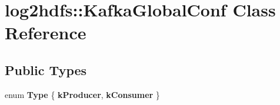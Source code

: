 \hypertarget{classlog2hdfs_1_1KafkaGlobalConf}{}\section{log2hdfs\+:\+:Kafka\+Global\+Conf Class Reference}
\label{classlog2hdfs_1_1KafkaGlobalConf}
\subsection*{Public Types}
\begin{DoxyCompactItemize}
\item 
enum {\bfseries Type} \{ {\bfseries k\+Producer}, 
{\bfseries k\+Consumer}
 \}\hypertarget{classlog2hdfs_1_1KafkaGlobalConf_a4841d3ac340b3a5eb2e9e82cda9bb131}{}\label{classlog2hdfs_1_1KafkaGlobalConf_a4841d3ac340b3a5eb2e9e82cda9bb131}

\end{DoxyCompactItemize}
